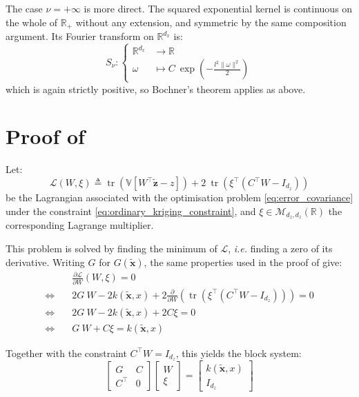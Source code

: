 The case $\nu=+\infty$ is more direct. The squared exponential kernel is continuous on the whole of $\mathbb{R}_+$ without any extension, and symmetric by the same composition argument. Its Fourier transform on $\mathbb{R}^{d_x}$ is:
\begin{equation}
	S_\nu:\left\{\begin{aligned}
	\mathbb{R}^{d_x}&\to\mathbb{R}\\
	\omega&\mapsto C\:\exp\left(-\frac{l^2\|\omega\|^2}{2}\right)
	\end{aligned}\right.
\end{equation}
which is again strictly positive, so Bochner's theorem applies as above.

\section[Proof of Proposition 3.8]{Proof of }\label{sec:proof_OK}

Let:
\begin{equation}
	\mathcal{L}(W,\xi)\triangleq\operatorname{tr}\left(\mathbb{V}\left[W^\top\tilde{\mathbf{z}}-z\right]\right)+2\:\operatorname{tr}\left(\xi^\top\left(C^\top W-I_{d_z}\right)\right)
\end{equation}
be the Lagrangian associated with the optimisation problem \eqref{eq:error_covariance} under the constraint \eqref{eq:ordinary_kriging_constraint}, and $\xi\in\mathcal{M}_{d_z,d_z}(\mathbb{R})$ the corresponding Lagrange multiplier.

This problem is solved by finding the minimum of $\mathcal{L}$, \textit{i.e.} finding a zero of its derivative. Writing $G$ for $G(\tilde{\mathbf{x}})$, the same properties used in the proof of  give:
\begin{equation}
	\begin{aligned}
	&\frac{\partial\mathcal{L}}{\partial W}(W,\xi)=0\\
	\iff\quad&2G\:W-2k(\tilde{\mathbf{x}},x)+2\frac{\partial}{\partial W}\left(\operatorname{tr}\left(\xi^\top\left(C^\top W-I_{d_z}\right)\right)\right)=0\\
	\iff\quad&2G\:W-2k(\tilde{\mathbf{x}},x)+2C\xi=0\\
	\iff\quad&G\:W+C\xi=k(\tilde{\mathbf{x}},x)
	\end{aligned}\label{eq:Lagrangian_minimum}
\end{equation}

Together with the constraint $C^\top W=I_{d_z}$, this yields the block system:
\begin{equation}
	\begin{bmatrix}
	G&C\\C^\top&0
	\end{bmatrix}\begin{bmatrix}
	W\\\xi
	\end{bmatrix}=\begin{bmatrix}
	k(\tilde{\mathbf{x}},x)\\I_{d_z}
	\end{bmatrix}
\end{equation}

